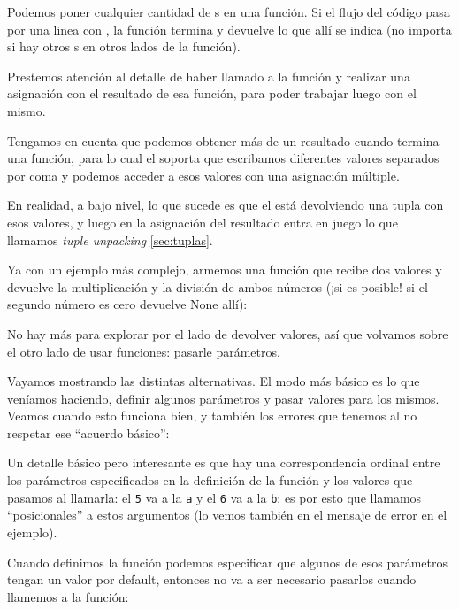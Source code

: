 Podemos poner cualquier cantidad de s en una función. Si el flujo del código pasa por una linea con , la función termina y devuelve lo que allí se indica (no importa si hay otros s en otros lados de la función).


Prestemos atención al detalle de haber llamado a la función y realizar una asignación con el resultado de esa función, para poder trabajar luego con el mismo.

Tengamos en cuenta que podemos obtener más de un resultado cuando termina una función, para lo cual el  soporta que escribamos diferentes valores separados por coma y podemos acceder a esos valores con una asignación múltiple.

\begin{info}
En realidad, a bajo nivel, lo que sucede es que el  está devolviendo una tupla con esos valores, y luego en la asignación del resultado entra en juego lo que llamamos \textit{tuple unpacking} \ref{sec:tuplas}.
\end{info}

Ya con un ejemplo más complejo, armemos una función que recibe dos valores y devuelve la multiplicación y la división de ambos números (¡si es posible! si el segundo número es cero devuelve None allí):


No hay más para explorar por el lado de devolver valores, así que volvamos sobre el otro lado de usar funciones: pasarle parámetros.

Vayamos mostrando las distintas alternativas. El modo más básico es lo que veníamos haciendo, definir algunos parámetros y pasar valores para los mismos. Veamos cuando esto funciona bien, y también los errores que tenemos al no respetar ese ``acuerdo básico'':


Un detalle básico pero interesante es que hay una correspondencia ordinal entre los parámetros especificados en la definición de la función y los valores que pasamos al llamarla: el \verb|5| va a la \verb|a| y el \verb|6| va a la \verb|b|; es por esto que llamamos ``posicionales'' a estos argumentos (lo vemos también en el mensaje de error en el ejemplo).

Cuando definimos la función podemos especificar que algunos de esos parámetros tengan un valor por default, entonces no va a ser necesario pasarlos cuando llamemos a la función:

